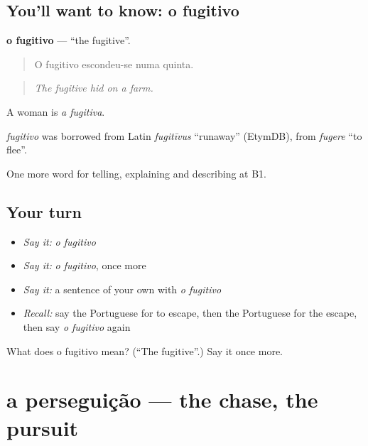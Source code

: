 \subsection*{You'll want to know: o fugitivo}
\textbf{o fugitivo} — \textquotedblleft{}the fugitive\textquotedblright{}.

\begin{quote}
O fugitivo escondeu-se numa quinta.
\end{quote}

\begin{quote}
\emph{The fugitive hid on a farm.}
\end{quote}

A woman is \emph{a fugitiva}.

\begin{cousinweb}
\emph{fugitivo} was borrowed from Latin \emph{fugitīvus} \textquotedblleft{}runaway\textquotedblright{} (EtymDB), from \emph{fugere} \textquotedblleft{}to flee\textquotedblright{}.
\end{cousinweb}

\begin{grammarlens}[title={What you've built}]
One more word for telling, explaining and describing at B1.
\end{grammarlens}

\subsection*{Your turn}
\begin{itemize}
\raggedright
  \item \emph{Say it:} \emph{o fugitivo}
  \item \emph{Say it:} \emph{o fugitivo}, once more
  \item \emph{Say it:} a sentence of your own with \emph{o fugitivo}
  \item \emph{Recall:} say the Portuguese for to escape, then the Portuguese for the escape, then say \emph{o fugitivo} again
\end{itemize}

\begin{tcolorbox}[breakable,colback=teal!4,colframe=teal!35!black,title={Before you move on}]
What does o fugitivo mean? (\textquotedblleft{}The fugitive\textquotedblright{}.) Say it once more.
\end{tcolorbox}
\section[a perseguição]{a perseguição — the chase, the pursuit}

